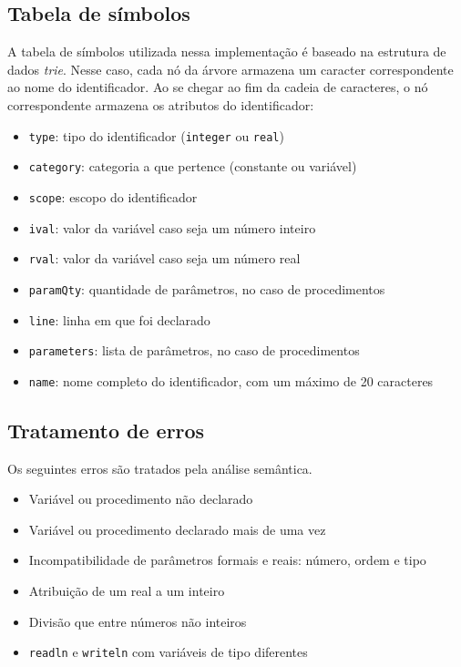 \documentclass{article}
\begin{document}
	\subsection{Tabela de símbolos} %
	\label{sub:tabela_de_simbolos}
		A tabela de símbolos utilizada nessa implementação é baseado na estrutura de dados \emph{trie}. Nesse caso, cada nó da árvore armazena um caracter correspondente ao nome do identificador. Ao se chegar ao fim da cadeia de caracteres, o nó correspondente armazena os atributos do identificador:

		\begin{itemize}
			\item \verb=type=: tipo do identificador (\verb=integer= ou \verb=real=)
			\item \verb=category=: categoria a que pertence (constante ou variável)
			\item \verb=scope=: escopo do identificador
			\item \verb=ival=: valor da variável caso seja um número inteiro
			\item \verb=rval=: valor da variável caso seja um número real
			\item \verb=paramQty=: quantidade de parâmetros, no caso de procedimentos
			\item \verb=line=: linha em que foi declarado
			\item \verb=parameters=: lista de parâmetros, no caso de procedimentos
			\item \verb=name=: nome completo do identificador, com um máximo de 20 caracteres
		\end{itemize}

	\subsection{Tratamento de erros} %
	\label{ssub:tratamento_de_erros}
		Os seguintes erros são tratados pela análise semântica.

		\begin{itemize}
			\item Variável ou procedimento não declarado
			\item Variável ou procedimento declarado mais de uma vez
			\item Incompatibilidade de parâmetros formais e reais: número, ordem e tipo
			\item Atribuição de um real a um inteiro
			\item Divisão que entre números não inteiros
			\item \verb=readln= e \verb=writeln= com variáveis de tipo diferentes
		\end{itemize}
	
\end{document}
